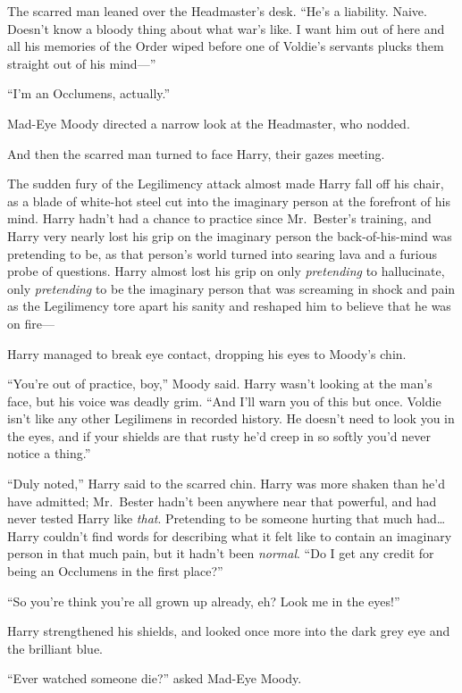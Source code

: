The scarred man leaned over the Headmaster's desk. ``He's a liability.
Naive. Doesn't know a bloody thing about what war's like. I want him out
of here and all his memories of the Order wiped before one of Voldie's
servants plucks them straight out of his mind---''

``I'm an Occlumens, actually.''

Mad-Eye Moody directed a narrow look at the Headmaster, who nodded.

And then the scarred man turned to face Harry, their gazes meeting.

The sudden fury of the Legilimency attack almost made Harry fall off his
chair, as a blade of white-hot steel cut into the imaginary person at
the forefront of his mind. Harry hadn't had a chance to practice since
Mr.~Bester's training, and Harry very nearly lost his grip on the
imaginary person the back-of-his-mind was pretending to be, as that
person's world turned into searing lava and a furious probe of
questions. Harry almost lost his grip on only \emph{pretending} to
hallucinate, only \emph{pretending} to be the imaginary person that was
screaming in shock and pain as the Legilimency tore apart his sanity and
reshaped him to believe that he was on fire---

Harry managed to break eye contact, dropping his eyes to Moody's chin.

``You're out of practice, boy,'' Moody said. Harry wasn't looking at the
man's face, but his voice was deadly grim. ``And I'll warn you of this
but once. Voldie isn't like any other Legilimens in recorded history. He
doesn't need to look you in the eyes, and if your shields are that rusty
he'd creep in so softly you'd never notice a thing.''

``Duly noted,'' Harry said to the scarred chin. Harry was more shaken
than he'd have admitted; Mr.~Bester hadn't been anywhere near that
powerful, and had never tested Harry like \emph{that}. Pretending to be
someone hurting that much had\ldots{} Harry couldn't find words for
describing what it felt like to contain an imaginary person in that much
pain, but it hadn't been \emph{normal}. ``Do I get any credit for being
an Occlumens in the first place?''

``So you're think you're all grown up already, eh? Look me in the
eyes!''

Harry strengthened his shields, and looked once more into the dark grey
eye and the brilliant blue.

``Ever watched someone die?'' asked Mad-Eye Moody.

